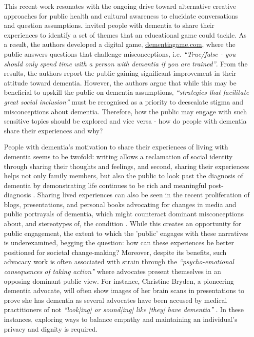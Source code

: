 This recent work resonates with the ongoing drive toward alternative creative approaches for public health and cultural awareness to elucidate conversations and question assumptions. \cite{carter2021effectiveness} invited people with dementia to share their experiences to identify a set of themes that an educational game could tackle. As a result, the authors developed a digital game, \href{https://www.dementiagame.com}{dementiagame.com}, where the public answers questions that challenge misconceptions, i.e. \textit{``True/false - you should only spend time with a person with dementia if you are trained''}. From the results, the authors report the public gaining significant improvement in their attitude toward dementia. However, the authors argue that while this may be beneficial to upskill the public on dementia assumptions, \textit{``strategies that facilitate great social inclusion''} must be recognised as a priority to deescalate stigma and misconceptions about dementia. Therefore, how the public may engage with such sensitive topics should be explored and vice versa - how do people with dementia share their experiences and why?

People with dementia's motivation to share their experiences of living with dementia seems to be twofold: writing allows a reclamation of social identity through sharing their thoughts and feelings, and second, sharing their experiences helps not only family members, but also the public to look past the diagnosis of dementia by demonstrating life continues to be rich and meaningful post-diagnosis \citep{ryan_dementia_2009}. Sharing lived experiences can also be seen in the recent proliferation of blogs, presentations, and personal books advocating for changes in media and public portrayals of dementia, which might counteract dominant misconceptions about, and stereotypes of, the condition \citep{christine_bryden_dancing_2005,bryden_challenging_2020}. While this creates an opportunity for public engagement, the extent to which the 'public' engages with these narratives is underexamined, begging the question: how can these experiences be better positioned for societal change-making? Moreover, despite its benefits, such advocacy work is often associated with strain through the \textit{``psycho-emotional consequences of taking action'' }\citep{bartlett_citizenship_2014} where advocates present themselves in an opposing dominant public view. For instance, Christine Bryden, a pioneering dementia advocate, will often show images of her brain scans in presentations to prove she has dementia as several advocates have been accused by medical practitioners of not \textit{``look[ing] or sound[ing] like [they] have dementia''} \citep{swaffer_but_2016}. In these instances, exploring ways to balance empathy and maintaining an individual's privacy and dignity is required.

